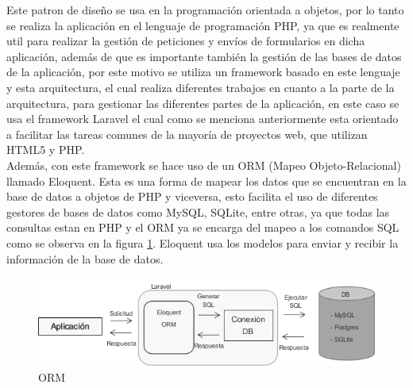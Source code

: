 Este patron de diseño se usa en la programación orientada a objetos, por lo tanto se realiza la aplicación en el lenguaje de programación PHP, ya que es realmente util para realizar la gestión de peticiones y envíos de formularios en dicha aplicación, además de que es importante también la gestión de las bases de datos de la aplicación, por este motivo se utiliza un framework basado en este lenguaje y esta arquitectura, el cual realiza diferentes trabajos en cuanto a la parte de la arquitectura, para gestionar las diferentes partes de la aplicación, en este caso se usa el framework Laravel el cual como se menciona anteriormente esta orientado a facilitar las tareas comunes de la mayoría de proyectos web, que utilizan HTML5 y PHP.\\

Además, con este framework se hace uso de un ORM (Mapeo Objeto-Relacional) llamado Eloquent. Esta es una forma de mapear los datos que se encuentran en la base de datos a objetos de PHP y viceversa, esto facilita el uso de diferentes gestores de bases de datos como MySQL, SQLite, entre otras, ya que todas las consultas estan en PHP y el ORM ya se encarga del mapeo a los comandos SQL como se observa en la figura \ref{fig:orm}. Eloquent usa los modelos para enviar y recibir la información de la base de datos.

\begin{figure}[H]
	\centering
	\caption{ORM}
	\label{fig:orm}
	\includegraphics[width=0.7\linewidth]{Imagenes/ORM}
\end{figure}



